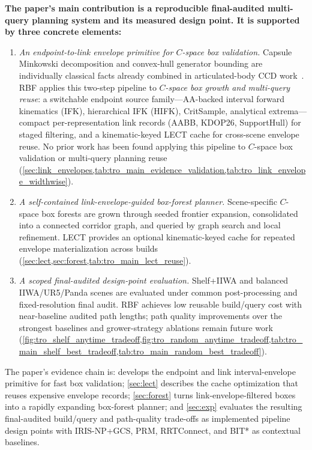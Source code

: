 \documentclass[journal]{IEEEtran}
\DeclareRobustCommand{\textsc}[1]{\textnormal{\MakeUppercase{#1}}}
\newcommand{\rbf}{\textsc{RBF}}
\begin{document}
\textbf{The paper's main contribution is a reproducible final-audited
multi-query planning system and its measured design point. It is supported by
three concrete elements:}
\begin{enumerate}[nosep]
  \item \emph{An endpoint-to-link envelope primitive for $C$-space box validation.}
  Capsule Minkowski decomposition and convex-hull generator bounding are
  individually classical facts already combined in articulated-body CCD
  work~\cite{redon2004ccd_avatar,redon2005fast_artic,zhang2007taylor}.
  \rbf{} applies this two-step pipeline to \emph{$C$-space box growth and
  multi-query reuse}: a switchable endpoint source family---AA-backed
  interval forward kinematics (IFK), hierarchical IFK (HIFK),
  CritSample, analytical extrema---compact
  per-representation link records (AABB, KDOP26, SupportHull) for staged
  filtering, and a kinematic-keyed LECT cache for cross-scene envelope reuse.
  No prior work has been found applying this pipeline to $C$-space box
  validation or multi-query planning reuse
  (\cref{sec:link_envelopes,tab:tro_main_evidence_validation,tab:tro_link_envelope_widthwise}).

  \item \emph{A self-contained link-envelope-guided box-forest planner.}
  Scene-specific $C$-space box forests are grown through seeded frontier
  expansion, consolidated into a connected corridor graph, and queried by
  graph search and local refinement. LECT provides an optional
  kinematic-keyed cache for repeated envelope materialization across builds
  (\cref{sec:lect,sec:forest,tab:tro_main_lect_reuse}).

  \item \emph{A scoped final-audited design-point evaluation.}
  Shelf+IIWA and balanced IIWA/UR5/Panda scenes are evaluated under common
  post-processing and fixed-resolution final audit. \rbf{} achieves low
  reusable build/query cost with near-baseline audited path lengths; path
  quality improvements over the strongest baselines and grower-strategy
  ablations remain future work
  (\cref{fig:tro_shelf_anytime_tradeoff,fig:tro_random_anytime_tradeoff,tab:tro_main_shelf_best_tradeoff,tab:tro_main_random_best_tradeoff}).
\end{enumerate}

The paper's evidence chain is:  develops the endpoint
and link interval-envelope primitive for fast box validation; \cref{sec:lect}
describes the cache optimization that reuses expensive envelope records;
\cref{sec:forest} turns link-envelope-filtered boxes into a rapidly expanding
box-forest planner; and \cref{sec:exp} evaluates the resulting final-audited
build/query and path-quality trade-offs as implemented pipeline design points
with IRIS-NP+GCS, PRM, RRTConnect, and BIT* as contextual baselines.
\end{document}
